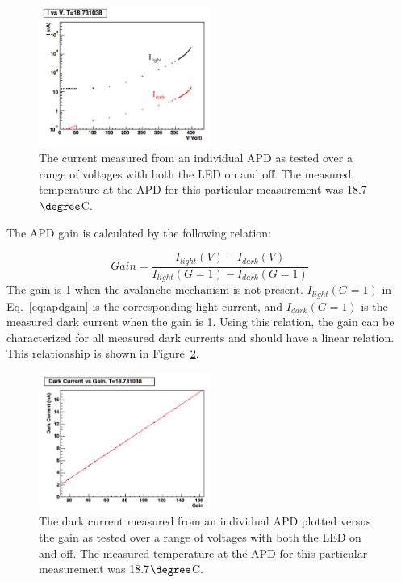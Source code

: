 \begin{figure}[h]
  \centering
      \includegraphics[width=0.5\textwidth]{pics/experiment/apdcurrent.png}
  \caption[APD current draw versus voltage with LED on and off]{The current measured from an individual APD as tested over a range of voltages with both the LED on and off. The measured temperature at the APD for this particular measurement was 18.7~$\degree$C.}
  \label{Figure:apdcurrent}
\end{figure}

The APD gain is calculated by the following relation:

\begin{equation}
	\label{eq:apdgain}
	Gain = \dfrac{I_{light}(V)-I_{dark}(V)}{I_{light}(G=1)-I_{dark}(G=1)} 
\end{equation}
The gain is 1 when the avalanche mechanism is not present. $I_{light}(G=1)$ in Eq.~\eqref{eq:apdgain} is the corresponding light current, and $I_{dark}(G=1)$ is the measured dark current when the gain is 1. Using this relation, the gain can be characterized for all measured dark currents and should have a linear relation. This relationship is shown in Figure~\ref{Figure:apdIvG}.

\begin{figure}[h]
  \centering
      \includegraphics[width=0.5\textwidth]{pics/experiment/apdIvG.png}
  \caption[APD measured dark current as a function of gain]{The dark current measured from an individual APD plotted versus the gain as tested over a range of voltages with both the LED on and off. The measured temperature at the APD for this particular measurement was 18.7$\degree$C.}
  \label{Figure:apdIvG}
\end{figure}

